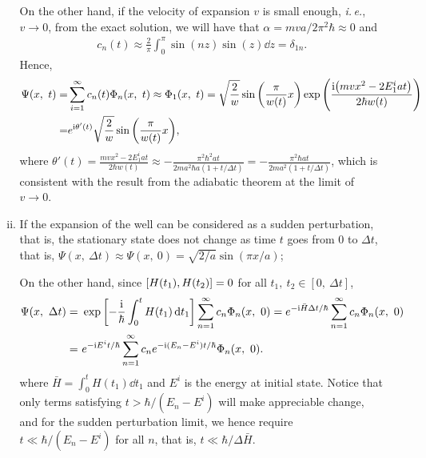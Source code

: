 \documentclass{article}
\newcommand{\iu}{\ensuremath{\mathrm{i}}}
\begin{document}
\begin{enumerate}[1.]
\begin{enumerate}[(i)]
    On the other hand, if the velocity of expansion $v$ is small enough, \emph{i.\,e.}, $v \to 0$, from the exact solution, we will have that $\alpha = mva/2\pi^2\hbar \approx 0$ and
    \begin{align*}
      c_n(t) \approx \frac{2}{\pi}\int_0^\pi \sin(nz)\sin(z)\dd{z} = \delta_{1n}.
    \end{align*} 
    Hence,
    \begin{align*}
      \Psi(x,\ t) =& \sum_{i=1}^\infty c_n(t)\Phi_n(x,\ t) \approx \Phi_1(x,\ t) =  \sqrt{\frac{2}{w}}\sin\qty(\frac{\pi}{w(t)}x)\exp\qty(\frac{\iu\qty(mvx^2 - 2E_1^iat)}{2\hbar w(t)})
      \\ =&  e^{\iu\theta'(t)} \sqrt{\frac{2}{w}}\sin\qty(\frac{\pi}{w(t)}x),
    \end{align*}
    where $\theta'(t) = \frac{mvx^2 - 2E_1^iat}{2\hbar w(t)} \approx - \frac{\pi^2\hbar^2at}{2ma^2\hbar a(1 + t/\Delta t)} = -\frac{\pi^2\hbar a t}{2ma^2 (1 + t/\Delta t)}$, which is consistent with the result from the adiabatic theorem at the limit of $v \to 0$.
    \item If the expansion of the well can be considered as a sudden perturbation, that is, the stationary state does not change as time $t$ goes from $0$ to $\Delta t$, that is, $\Psi(x,\ \Delta t) \approx \Psi(x,\ 0) = \sqrt{2/a}\sin(\pi x / a)$;
    
    On the other hand, since $\comm{H(t_1)}{H(t_2)} = 0$ for all $t_1,\ t_2 \in [0,\ \Delta t]$,
    \begin{align*}
      \Psi(x,\ \Delta t) =&\ \exp\qty[-\frac{\iu}{\hbar}\int_0^t H(t_1) \dd{t_1}] \sum_{n=1}^\infty c_n \Phi_n (x,\ 0) = e^{-\iu \bar{H} \Delta t/\hbar} \sum_{n=1}^\infty c_n \Phi_n (x,\ 0) \\
      =&\ e^{-\iu E^i t/\hbar}\sum_{n=1}^\infty c_n e^{-\iu(E_n - E^i)t/\hbar} \Phi_n (x,\ 0).
    \end{align*} 
    where $\bar{H} = \int_0^t H(t_1) \dd{t_1}$ and $E^i$ is the energy at initial state. Notice that only terms satisfying $t > \hbar/(E_n - E^i)$ will make appreciable change, and for the sudden perturbation limit, we hence require $t \ll \hbar/(E_n - E^i)$ for all $n$, that is, $t \ll \hbar/\Delta \bar{H}$.
  \end{enumerate}


\end{enumerate}
\end{document}
